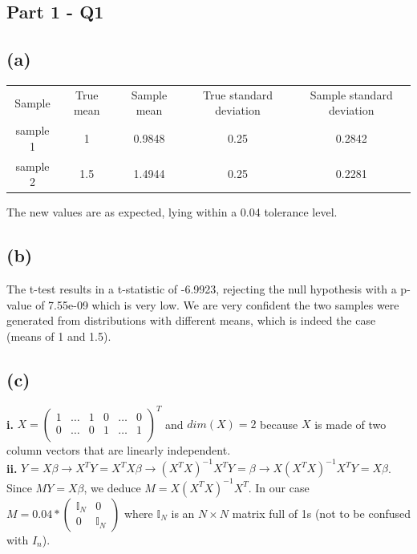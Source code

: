 \documentclass[12pt,a4paper,oneside]{report}
\begin{document}

\subsection*{Part 1 - Q1}
\subsection*{(a)}

\begin{center}
\begin{tabular}{c | c | c | c | c}
Sample & True mean & Sample mean & True standard deviation & Sample standard deviation\\
sample 1 & 1 & 0.9848 & 0.25 & 0.2842\\
sample 2 & 1.5 & 1.4944 & 0.25 & 0.2281\\
\end{tabular}
\end{center}

The new values are as expected, lying within a 0.04 tolerance level.

\subsection*{(b)}

The t-test results in a t-statistic of -6.9923, rejecting the null hypothesis with a p-value of 7.55e-09 which is very low. We are very confident the two samples were generated from distributions with different means, which is indeed the case (means of 1 and 1.5).

\subsection*{(c)}

\textbf{i.} $X = \begin{pmatrix}
1 & \dots & 1 & 0 & \dots & 0\\
0 & \dots & 0 & 1 & \dots & 1\\

\end{pmatrix}^T$ and $dim(X) = 2$ because $X$ is made of two column vectors that are linearly independent.\\


\textbf{ii.} $Y = X\beta \to X^TY = X^TX\beta \to (X^TX)^{-1}X^TY = \beta \to X(X^TX)^{-1}X^TY = X\beta$. Since $MY = X\beta$, we deduce $M = X(X^TX)^{-1}X^T$. In our case $M = 
0.04 * \begin{pmatrix}
\mathbb{I}_N & 0\\
0 & \mathbb{I}_N
\end{pmatrix}
$
where $\mathbb{I}_N$ is an $N \times N$ matrix full of 1s (not to be confused with $I_n$).\\
                          
\end{document}
